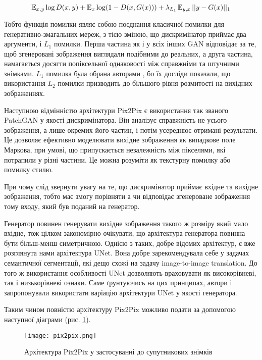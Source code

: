 \begin{equation} \label{eq:pix2pix_loss}
    \operatorname{\mathbb{E}}_{x, y} \log D(x,y) +
    \operatorname{\mathbb{E}}_{x} \log (1 - D(x, G(x))) +
    \lambda_{L_1} \operatorname{\mathbb{E}}_{y, x} ||y - G(x)||_1
\end{equation}

Тобто функція помилки являє собою поєднання класичної помилки
для генеративно-змагальних мереж, з тією зміною, що дискримінатор приймає
два аргументи, і $L_1$ помилки. Перша частина як і у всіх інших
GAN відповідає за те, щоб згенеровані зображення виглядали подібними
до реальних, а друга частина, намагається досягти
попіксельної однаковості між справжніми та штучними знімками.
$L_1$ помилка була обрана авторами \cite{pix2pix}, бо їх досліди
показали, що використання $L_2$ помилки призводить до більшого
рівня розмитості на вихідних зображеннях.

Наступною відмінністю архітектури Pix2Pix є використання так званого
PatchGAN у якості дискримінатора. Він аналізує справжність не усього
зображення, а лише окремих його частин, і потім усереднює отримані результати.
Це дозволяє ефективно моделювати вихідне зображення як
випадкове поле Маркова, при умові, що припускається
незалежність між пікселями, які потрапили у різні частини.
Це можна розуміти \cite{pix2pix} як текстурну помилку або помилку стилю.

При чому слід звернути увагу на те, що дискримінатор приймає
вхідне та вихідне зображення, тобто має змогу
порівняти а чи відповідає згенероване зображення тому
входу, який був поданий на генератор.

Генератор повинен генерувати вихідне зображення такого ж
розміру який мало вхідне, тож цілком закономірно очікувати,
що архітектура генератора повинна бути більш-менш симетричною.
Однією з таких, добре відомих архітектур, є вже розглянута
нами архітектура UNet. Вона добре зарекомендувала себе у
задачах семантичної сегментації, які дещо схожі на задачу image-to-image translation.
До того ж використання особливості UNet дозволяють враховувати як
високорівневі, так і низькорівневі ознаки. Саме ґрунтуючись на цих
принципах, автори \cite{pix2pix} і запропонували використати
варіацію архітектури UNet у якості генератора.

Таким чином повністю архітектуру Pix2Pix можливо подати за допомогою наступної
діаграми (рис. \ref{fig:pix2pix}).

\begin{figure}[!ht]
    \centering
    \texttt{[image: pix2pix.png]}
    \caption{Архітектура Pix2Pix у застосуванні до супутникових знімків}
    \label{fig:pix2pix}
\end{figure}


